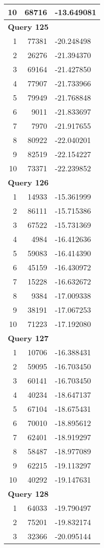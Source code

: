 \begin{longtable}[{p}]{@{}rrp{}@{}}
10 & 68716 & -13.649081 \\
\midrule
\multicolumn{3}{l}{\bfseries Query 125} \\
1 & 77381 & -20.248498 \\
2 & 26276 & -21.394370 \\
3 & 69164 & -21.427850 \\
4 & 77907 & -21.733966 \\
5 & 79949 & -21.768848 \\
6 & 9011 & -21.833697 \\
7 & 7970 & -21.917655 \\
8 & 80922 & -22.040201 \\
9 & 82519 & -22.154227 \\
10 & 73371 & -22.239852 \\
\midrule
\multicolumn{3}{l}{\bfseries Query 126} \\
1 & 14933 & -15.361999 \\
2 & 86111 & -15.715386 \\
3 & 67522 & -15.731369 \\
4 & 4984 & -16.412636 \\
5 & 59083 & -16.414390 \\
6 & 45159 & -16.430972 \\
7 & 15228 & -16.632672 \\
8 & 9384 & -17.009338 \\
9 & 38191 & -17.067253 \\
10 & 71223 & -17.192080 \\
\midrule
\multicolumn{3}{l}{\bfseries Query 127} \\
1 & 10706 & -16.388431 \\
2 & 59095 & -16.703450 \\
3 & 60141 & -16.703450 \\
4 & 40234 & -18.647137 \\
5 & 67104 & -18.675431 \\
6 & 70010 & -18.895612 \\
7 & 62401 & -18.919297 \\
8 & 58487 & -18.977089 \\
9 & 62215 & -19.113297 \\
10 & 40292 & -19.147631 \\
\midrule
\multicolumn{3}{l}{\bfseries Query 128} \\
1 & 64033 & -19.790497 \\
2 & 75201 & -19.832174 \\
3 & 32366 & -20.095144 \\

\end{longtable}
